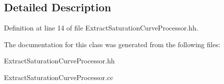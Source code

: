 \subsection{Detailed Description}


Definition at line 14 of file Extract\-Saturation\-Curve\-Processor.\-hh.



The documentation for this class was generated from the following files\-:\begin{DoxyCompactItemize}
\item 
Extract\-Saturation\-Curve\-Processor.\-hh\item 
Extract\-Saturation\-Curve\-Processor.\-cc\end{DoxyCompactItemize}
